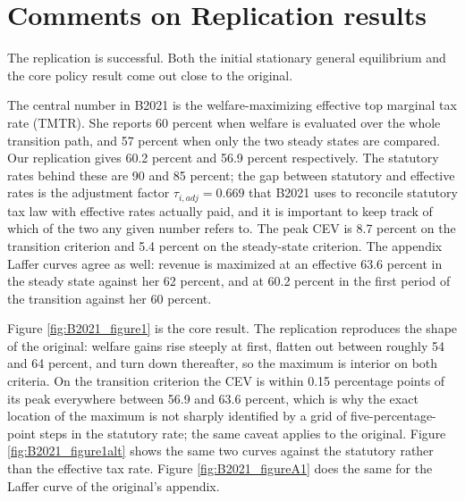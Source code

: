 \documentclass[11pt,fleqn]{article}
\begin{document}
\section{Comments on Replication results}
The replication is successful. Both the initial stationary general equilibrium and the core policy result come out close to the original.

The central number in B2021 is the welfare-maximizing effective top marginal tax rate (TMTR). She reports 60 percent when welfare is evaluated over the whole transition path, and 57 percent when only the two steady states are compared. Our replication gives 60.2 percent and 56.9 percent respectively. The statutory rates behind these are 90 and 85 percent; the gap between statutory and effective rates is the adjustment factor $\tau_{i,adj}=0.669$ that B2021 uses to reconcile statutory tax law with effective rates actually paid, and it is important to keep track of which of the two any given number refers to. The peak CEV is 8.7 percent on the transition criterion and 5.4 percent on the steady-state criterion. The appendix Laffer curves agree as well: revenue is maximized at an effective 63.6 percent in the steady state against her 62 percent, and at 60.2 percent in the first period of the transition against her 60 percent.

Figure \ref{fig:B2021_figure1} is the core result. The replication reproduces the shape of the original: welfare gains rise steeply at first, flatten out between roughly 54 and 64 percent, and turn down thereafter, so the maximum is interior on both criteria. On the transition criterion the CEV is within 0.15 percentage points of its peak everywhere between 56.9 and 63.6 percent, which is why the exact location of the maximum is not sharply identified by a grid of five-percentage-point steps in the statutory rate; the same caveat applies to the original. Figure \ref{fig:B2021_figure1alt} shows the same two curves against the statutory rather than the effective tax rate. Figure \ref{fig:B2021_figureA1} does the same for the Laffer curve of the original's appendix.
\end{document}
